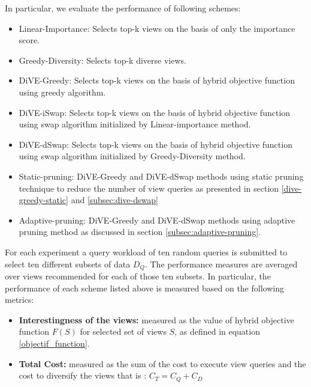 In particular, we evaluate the performance of following schemes:
\begin{itemize}
	\item Linear-Importance: Selects top-k views on the basis of only the importance score.
	\item Greedy-Diversity: Selects top-k diverse views.
	\item DiVE-Greedy: Selects top-k views on the basis of hybrid objective function using greedy algorithm.
	\item DiVE-iSwap: Selects top-k views on the basis of hybrid objective function using swap algorithm initialized by Linear-importance method. 
	\item DiVE-dSwap: Selects top-k views on the basis of hybrid objective function using swap algorithm initialized by Greedy-Diversity method.
	\item Static-pruning: DiVE-Greedy and DiVE-dSwap methods using static pruning technique to reduce the number of view queries as presented in section \ref{dive-greedy-static}  and \ref{subsec:dive-dswap}
	\item Adaptive-pruning: DiVE-Greedy and DiVE-dSwap methods using adaptive pruning method as discussed in section \ref{subsec:adaptive-pruning}.	
\end{itemize}
For each experiment a query workload of ten random queries is submitted to select ten different subsets of data $D_Q$. The performance measures are averaged over views recommended for each of those ten subsets. In particular, the performance of each scheme listed above is measured based on the following metrics:
\begin{itemize}
	\item {\bf  Interestingness of the views:} measured as the value of hybrid objective function 
    $F\left(S\right)$ for selected set of views $S$, as defined in equation \ref{objectif_function}.
	\item {\bf Total Cost:} measured as the sum of the cost to execute view queries and the cost to diversify the views that is : $C_T= C_Q + C_D$
\end{itemize}

